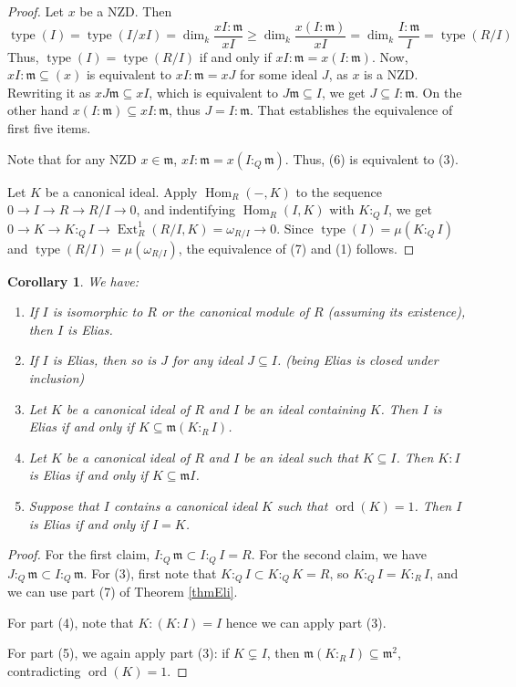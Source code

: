 \documentclass[a4paper,12pt]{amsart}
\newtheorem{cor}[thm]{\bf Corollary}
\theoremstyle{definition}
\theoremstyle{remark}
\numberwithin{equation}{section}
\DeclareMathOperator{\type}{{type}}
\DeclareMathOperator{\Ext}{{Ext}}
\DeclareMathOperator{\Hom}{{Hom}}
\DeclareMathOperator{\ord}{{ord}}
\def\fm{\mathfrak{m}}
\newcommand{\ses}[3]{0 \to {#1} \to {#2} \to {#3} \to 0}
\begin{document}
\begin{proof}
Let $x$ be a NZD. Then $$\type(I) = \type(I/xI) = \dim_k\frac{xI:\fm}{xI} \geq \dim_k\frac{x(I:\fm)}{xI} =\dim_k\frac{I:\fm}{I}= \type(R/I)$$
Thus, $\type(I) = \type(R/I)$ if and only if $xI:\fm = x(I:\fm)$. Now, $xI:\fm \subseteq (x)$ is equivalent to  $xI:\fm =xJ$ for some ideal $J$, as $x$ is a NZD. Rewriting it as $xJ\fm\subseteq xI$, which is equivalent to $J\fm\subseteq I$, we get $J\subseteq I:\fm$. On the other hand $x(I:\fm)\subseteq xI:\fm$, thus $J=I:\fm$.   That establishes the equivalence of first five items. 

Note that for any NZD $x\in \fm$, $xI:\fm = x(I:_Q\fm)$. Thus, (6) is equivalent to (3). 

Let $K$ be a canonical ideal. Apply $\Hom_R(-, K)$ to the sequence $\ses{I}{R}{R/I}$, and indentifying $\Hom_R(I,K)$ with $K:_QI$, we get 
$\ses{K}{K:_Q I}{\Ext^1_R(R/I,K)= \omega_{R/I}}$. Since $\type(I) =\mu(K:_Q I)$ and $ \type(R/I) =\mu(\omega_{R/I})$, the equivalence of (7) and (1) follows. 


\end{proof}



\begin{cor}\label{cor1}
We have:
\begin{enumerate}
\item If $I$ is isomorphic to $R$ or the canonical module of $R$ (assuming its existence), then $I$ is Elias.
\item If $I$ is Elias, then so is $J$ for any ideal $J\subseteq I$. (being  Elias is closed under inclusion) 
\item Let $K$ be a canonical ideal of $R$ and $I$ be an ideal containing $K$. Then $I$ is Elias if and only if $K\subseteq \fm(K:_RI)$. 
\item Let $K$ be a canonical ideal of $R$ and $I$ be an ideal such that $K\subseteq I$. Then $K:I$ is Elias  if and only if $K\subseteq \fm I$.
\item Suppose that $I$ contains a canonical ideal $K$ such that $\ord(K)=1$. Then $I$ is Elias if and only if $I=K$. 
\end{enumerate}
\end{cor}

\begin{proof}
For the first claim, $I:_Q\fm\subset I:_QI=R$. For the second claim, we have $J:_Q\fm\subset I:_Q\fm$. For (3), first note that $K:_QI \subset K:_QK=R$, so $K:_QI = K:_RI$, and we can use part (7) of Theorem \ref{thmEli}. 

For part (4), note that $K:(K:I)=I$ hence we can apply part (3). 

For part (5), we again apply part (3): if $K\subsetneq I$, then $\fm(K:_RI)\subseteq \fm^2$, contradicting $\ord(K)=1$. 

\end{proof}
\end{document}
